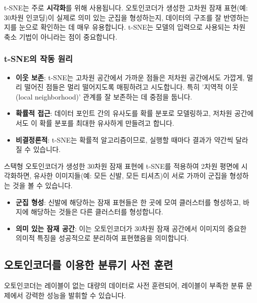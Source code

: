 \documentclass[11pt,a4paper]{article}
\theoremstyle{definition}
\begin{document}
\begin{infobox}
t-SNE는 주로 \textbf{시각화}를 위해 사용됩니다. 오토인코더가 생성한 고차원 잠재 표현(예: 30차원 인코딩)이 실제로 의미 있는 군집을 형성하는지, 데이터의 구조를 잘 반영하는지를 눈으로 확인하는 데 매우 유용합니다. t-SNE는 모델의 입력으로 사용되는 차원 축소 기법이 아니라는 점이 중요합니다.
\end{infobox}

\subsubsection{t-SNE의 작동 원리}
\begin{itemize}
    \item \textbf{이웃 보존}: t-SNE는 고차원 공간에서 가까운 점들은 저차원 공간에서도 가깝게, 멀리 떨어진 점들은 멀리 떨어지도록 매핑하려고 시도합니다. 특히 '지역적 이웃(local neighborhood)' 관계를 잘 보존하는 데 중점을 둡니다.
    \item \textbf{확률적 접근}: 데이터 포인트 간의 유사도를 확률 분포로 모델링하고, 저차원 공간에서도 이 확률 분포를 최대한 유사하게 만들려고 합니다.
    \item \textbf{비결정론적}: t-SNE는 확률적 알고리즘이므로, 실행할 때마다 결과가 약간씩 달라질 수 있습니다.
\end{itemize}

\begin{examplebox}
스택형 오토인코더가 생성한 30차원 잠재 표현에 t-SNE를 적용하여 2차원 평면에 시각화하면, 유사한 이미지들(예: 모든 신발, 모든 티셔츠)이 서로 가까이 군집을 형성하는 것을 볼 수 있습니다.
\begin{itemize}
    \item \textbf{군집 형성}: 신발에 해당하는 잠재 표현들은 한 곳에 모여 클러스터를 형성하고, 바지에 해당하는 것들은 다른 클러스터를 형성합니다.
    \item \textbf{의미 있는 잠재 공간}: 이는 오토인코더가 30차원 잠재 공간에서 이미지의 중요한 의미적 특징을 성공적으로 분리하여 표현했음을 의미합니다.
\end{itemize}
\end{examplebox}

\subsection{오토인코더를 이용한 분류기 사전 훈련}
오토인코더는 레이블이 없는 대량의 데이터로 사전 훈련되어, 레이블이 부족한 분류 문제에서 강력한 성능을 발휘할 수 있습니다.
\end{document}

